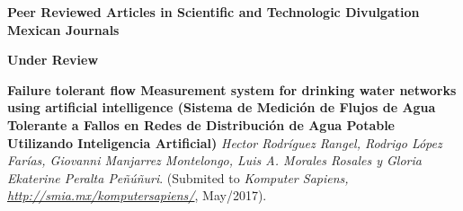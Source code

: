 \documentclass[10pt]{article}
\newenvironment{innerlist}[1][\enskip\textbullet]%
        {\begin{compactitem}[#1]}{\end{compactitem}}
\newcommand{\blankline}{\quad\pagebreak[2]}
\begin{document}
\blankline

\textbf{Peer Reviewed Articles in Scientific and Technologic Divulgation Mexican Journals }

\textbf{Under Review}
\begin{innerlist}
\item \textbf{Failure tolerant flow Measurement system for drinking water networks using artificial intelligence (Sistema de Medición de Flujos de Agua Tolerante a
Fallos en Redes de Distribución de Agua Potable
Utilizando Inteligencia Artificial)} \textit{Hector Rodríguez Rangel, Rodrigo López Farías, Giovanni Manjarrez Montelongo, Luis A. Morales Rosales y Gloria Ekaterine Peralta Peñúñuri}.   (Submited to \textit{Komputer Sapiens, \url{http://smia.mx/komputersapiens/}}, May/2017).
\end{innerlist}


\blankline
\end{document}
